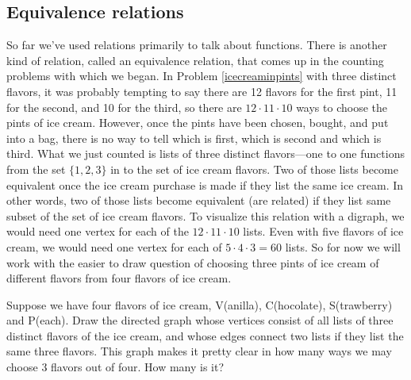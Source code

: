 \subsection{Equivalence relations}\label{equivalencerelations} So
far we've used relations primarily to talk about functions. 
There is another kind of relation, called an equivalence
relation, that comes up in the counting problems with which we
began.
 In Problem
\ref{icecreaminpints} with three distinct flavors, it was
probably tempting to say there are 12 flavors for the first
pint, 11 for the second, and 10 for the third, so there are
$12\cdot 11\cdot 10$ ways to choose the pints of ice cream. 
However, once the pints have been chosen, bought, and put into a
bag, there is no way to tell which is first, which is second and
which is third.  What we just counted is lists of three
distinct flavors---one to one functions from the set
$\{1,2,3\}$ in to the set of ice cream flavors.  Two of those
lists become equivalent once the ice cream purchase is
made if they list the same ice cream.  In other words, two of
those lists become equivalent (are related) if they list same
subset of the set of ice cream flavors.  To visualize this
relation with a digraph, we would need one vertex for each of
the 
$12\cdot 11\cdot 10$ lists.  Even with
 five flavors of ice cream, we would need one vertex for each
of
$5\cdot4\cdot3=60$ lists.  So for now we will work with the easier
to draw question of choosing three pints of ice cream of different
flavors from four flavors of ice cream.

\bp
\item Suppose we have four flavors of ice cream, V(anilla),
C(hocolate), S(trawberry) and P(each).  Draw the directed
graph whose vertices consist of all lists of three distinct
flavors of the ice cream, and whose edges connect two lists if
they list the same three flavors.  This graph makes it
pretty clear in how many ways we may choose 3 flavors
out of four.  How many is it?\label{fourchoosethree}

